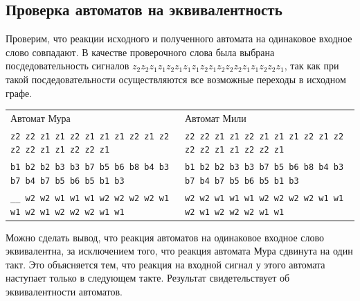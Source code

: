 \documentclass[12pt, a4paper]{article}
\begin{document}
\subsection*{Проверка автоматов на эквивалентность}

Проверим, что реакции исходного и полученного автомата на одинаковое входное
слово совпадают. В качестве проверочного слова была выбрана посдедовательность
сигналов \texttt{$z_2 z_2 z_1 z_1 z_2 z_1 z_1 z_1 z_2 z_1 z_2 z_2 z_2 z_1 z_1
  z_2 z_2 z_1$}, так как при такой посдедовательности осуществляются все
возможные переходы в исходном графе.

\noindent
\begin{scriptsize}
\begin{tabular}{ l | l }
  \normalsize{Автомат Мура} & \normalsize{Автомат Мили} \\
  \texttt{z2 z2 z1 z1 z2 z1 z1 z1 z2 z1 z2 z2 z2 z1 z1 z2 z2 z1} & 
    \texttt{z2 z2 z1 z1 z2 z1 z1 z1 z2 z1 z2 z2 z2 z1 z1 z2 z2 z1} \\
  \texttt{b1 b2 b2 b3 b3 b7 b5 b6 b8 b4 b3 b7 b4 b7 b5 b6 b5 b1 b3} &
    \texttt{b1 b2 b2 b3 b3 b7 b5 b6 b8 b4 b3 b7 b4 b7 b5 b6 b5 b1 b3} \\
  \texttt{\_\_ w2 w2 w1 w1 w1 w2 w2 w2 w2 w1 w1 w2 w1 w2 w2 w2 w1 w1} &
    \texttt{w2 w2 w1 w1 w1 w2 w2 w2 w2 w1 w1 w2 w1 w2 w2 w2 w1 w1}
\end{tabular}
\end{scriptsize}

Можно сделать вывод, что реакция автоматов на одинаковое входное слово
эквивалентна, за исключением того, что реакция автомата Мура сдвинута на один
такт. Это объясняется тем, что реакция на входной сигнал у этого автомата
наступает только в следующем такте. Результат свидетельствует об эквивалентности
автоматов.
\end{document}
